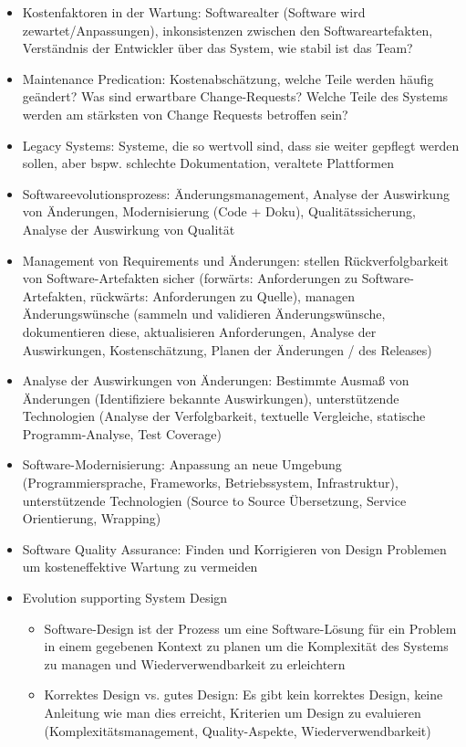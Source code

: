 \documentclass[paper=a4, fontsize=11pt]{scrartcl} %
\numberwithin{equation}{section} %
\numberwithin{figure}{section} %
\numberwithin{table}{section} %
\begin{document}
\begin{itemize}
  \item Kostenfaktoren in der Wartung: Softwarealter (Software wird zewartet/Anpassungen), inkonsistenzen zwischen den Softwareartefakten, Verständnis der Entwickler über das System, wie stabil ist das Team?
  \item Maintenance Predication: Kostenabschätzung, welche Teile werden häufig geändert? Was sind erwartbare Change-Requests? Welche Teile des Systems werden am stärksten von Change Requests betroffen sein?
  \item Legacy Systems: Systeme, die so wertvoll sind, dass sie weiter gepflegt werden sollen, aber bspw. schlechte Dokumentation, veraltete Plattformen
  \item Softwareevolutionsprozess: Änderungsmanagement, Analyse der Auswirkung von Änderungen, Modernisierung (Code + Doku), Qualitätssicherung, Analyse der Auswirkung von Qualität
  \item Management von Requirements und Änderungen: stellen Rückverfolgbarkeit von Software-Artefakten sicher (forwärts: Anforderungen zu Software-Artefakten, rückwärts: Anforderungen zu Quelle), managen Änderungswünsche (sammeln und validieren Änderungswünsche, dokumentieren diese, aktualisieren Anforderungen, Analyse der Auswirkungen, Kostenschätzung, Planen der Änderungen / des Releases)
  \item Analyse der Auswirkungen von Änderungen: Bestimmte Ausmaß von Änderungen (Identifiziere bekannte Auswirkungen), unterstützende Technologien (Analyse der Verfolgbarkeit, textuelle Vergleiche, statische Programm-Analyse, Test Coverage)
  \item Software-Modernisierung: Anpassung an neue Umgebung (Programmiersprache, Frameworks, Betriebssystem, Infrastruktur), unterstützende Technologien (Source to Source Übersetzung, Service Orientierung, Wrapping)
  \item Software Quality Assurance: Finden und Korrigieren von Design Problemen um kosteneffektive Wartung zu vermeiden
  \item Evolution supporting System Design
  \begin{itemize}
    \item Software-Design ist der Prozess um eine Software-Lösung für ein Problem in einem gegebenen Kontext zu planen um die Komplexität des Systems zu managen und Wiederverwendbarkeit zu erleichtern
    \item Korrektes Design vs. gutes Design: Es gibt kein korrektes Design, keine Anleitung wie man dies erreicht, Kriterien um Design zu evaluieren (Komplexitätsmanagement, Quality-Aspekte, Wiederverwendbarkeit)

\end{itemize}
\end{itemize}
\end{document}
